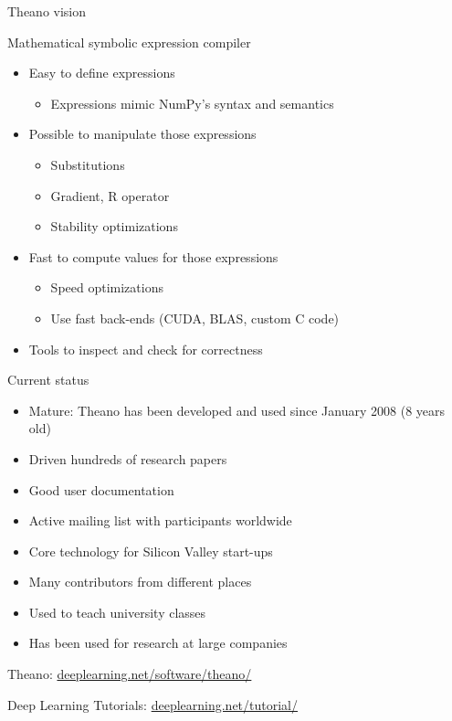 \documentclass[a4paper,9pt]{beamer}
\begin{document}
\begin{frame}{Theano vision}

  Mathematical symbolic expression compiler

  \begin{itemize}
    \item Easy to define expressions
      \begin{itemize}
        \item Expressions mimic NumPy's syntax and semantics
      \end{itemize}
    \item Possible to manipulate those expressions
      \begin{itemize}
        \item Substitutions
        \item Gradient, R operator
        \item Stability optimizations
      \end{itemize}
    \item Fast to compute values for those expressions
      \begin{itemize}
        \item Speed optimizations
        \item Use fast back-ends (CUDA, BLAS, custom C code)
      \end{itemize}
    \item Tools to inspect and check for correctness
  \end{itemize}
\end{frame}

\begin{frame}[fragile]{Current status}
  \begin{itemize}
    \item Mature: Theano has been developed and used since January 2008 (8 years old)
    \item Driven hundreds of research papers
    \item Good user documentation
    \item Active mailing list with participants worldwide
    \item Core technology for Silicon Valley start-ups
    \item Many contributors from different places
    \item Used to teach university classes
    \item Has been used for research at large companies
  \end{itemize}
  Theano: \url{deeplearning.net/software/theano/}

  Deep Learning Tutorials: \url{deeplearning.net/tutorial/}
\end{frame}
\end{document}
